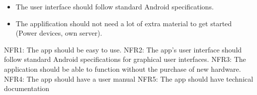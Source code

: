 \begin{itemize}
\item The user interface should follow standard Android specifications. 
\item The applification should not need a lot of extra material to get started (Power devices, own server).
\end{itemize}


NFR1: The app should be easy to use.
NFR2: The app’s user interface should follow standard Android specifications for graphical user interfaces. 
NFR3: The application should be able to function without the purchase of new hardware. 
NFR4: The app should have a user manual
NFR5: The app should have technical documentation
